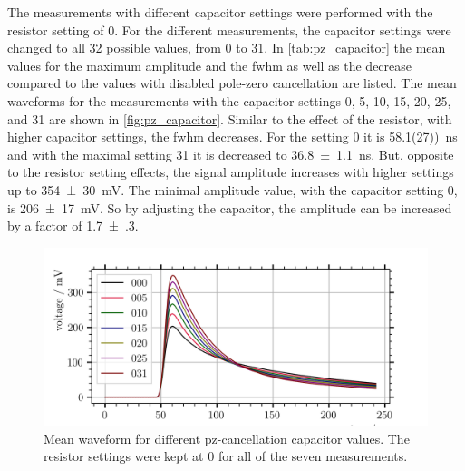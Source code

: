 The measurements with different capacitor settings were performed with the resistor setting of 0.
For the different measurements, the capacitor settings were changed to all 32 possible values, from 0 to 31.
In \autoref{tab:pz_capacitor} the mean values for the maximum amplitude and the \ac{fwhm} as well as the decrease compared to the values with disabled pole-zero cancellation are listed.
The mean waveforms for the measurements with the capacitor settings 0, 5, 10, 15, 20, 25, and 31 are shown in \autoref{fig:pz_capacitor}.
Similar to the effect of the resistor, with higher capacitor settings, the \ac{fwhm} decreases.
For the setting 0 it is \SI{58.1(27))}{\nano\second} and with the maximal setting 31 it is decreased to \SI{36.8(11)}{\nano\second}.
But, opposite to the resistor setting effects, the signal amplitude increases with higher settings up to \SI{354(30)}{\milli\volt}.
The minimal amplitude value, with the capacitor setting 0, is \SI{206(17)}{\milli\volt}.
So by adjusting the capacitor, the amplitude can be increased by a factor of \num{1.7(3)}.
\begin{figure}
	\centering
	\includegraphics[width=1.\textwidth]{pictures/pz_capacitor}
	\caption[Mean waveform for different pz-cancellation capacitor values.]{Mean waveform for different pz-cancellation capacitor values. The resistor settings were kept at 0 for all of the seven measurements.}
	\label{fig:pz_capacitor}
\end{figure}

